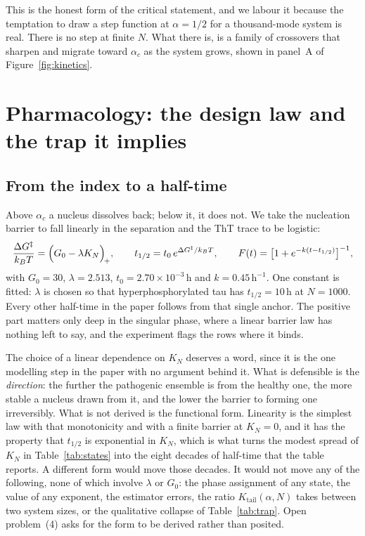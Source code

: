\documentclass[11pt,reqno]{amsart}
\theoremstyle{plain}
\theoremstyle{definition}
\theoremstyle{remark}
\numberwithin{equation}{section}
\newcommand{\Kt}{K_{\mathrm{tail}}}
\newcommand{\ac}{\alpha_c}
\newcommand{\kT}{k_{B}T}
\begin{document}
This is the honest form of the critical statement, and we labour it because the temptation to draw a step function at $\alpha=1/2$ for a thousand-mode system is real. There is no step at finite $N$. What there is, is a family of crossovers that sharpen and migrate toward $\ac$ as the system grows, shown in panel~A of Figure~\ref{fig:kinetics}.

\section{Pharmacology: the design law and the trap it implies}
\label{sec:pharm}

\subsection{From the index to a half-time}
Above $\ac$ a nucleus dissolves back; below it, it does not. We take the nucleation barrier to fall linearly in the separation and the ThT trace to be logistic:
\begin{equation}
\label{eq:kinetics}
\frac{\Delta G^{\ddagger}}{\kT} = \Bigl(G_0 - \lambda K_N\Bigr)_{\!+},
\qquad
t_{1/2} = t_0\,e^{\Delta G^{\ddagger}/\kT},
\qquad
F(t) = \bigl[1+e^{-k(t-t_{1/2})}\bigr]^{-1},
\end{equation}
with $G_0=30$, $\lambda=2.513$, $t_0=2.70\times10^{-3}$\,h and $k=0.45\,\mathrm{h}^{-1}$. One constant is fitted: $\lambda$ is chosen so that hyperphosphorylated tau has $t_{1/2}=10$\,h at $N=1000$. Every other half-time in the paper follows from that single anchor. The positive part matters only deep in the singular phase, where a linear barrier law has nothing left to say, and the experiment flags the rows where it binds.

The choice of a linear dependence on $K_N$ deserves a word, since it is the one modelling step in the paper with no argument behind it. What is defensible is the \emph{direction}: the further the pathogenic ensemble is from the healthy one, the more stable a nucleus drawn from it, and the lower the barrier to forming one irreversibly. What is not derived is the functional form. Linearity is the simplest law with that monotonicity and with a finite barrier at $K_N=0$, and it has the property that $t_{1/2}$ is exponential in $K_N$, which is what turns the modest spread of $K_N$ in Table~\ref{tab:states} into the eight decades of half-time that the table reports. A different form would move those decades. It would not move any of the following, none of which involve $\lambda$ or $G_0$: the phase assignment of any state, the value of any exponent, the estimator errors, the ratio $\Kt(\alpha,N)$ takes between two system sizes, or the qualitative collapse of Table~\ref{tab:trap}. Open problem~(4) asks for the form to be derived rather than posited.
\end{document}
